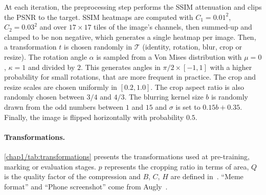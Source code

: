 At each iteration, the preprocessing step performs the SSIM attenuation and clips the PSNR to the target. 
SSIM heatmaps are computed with $C_1=0.01^2$, $C_2=0.03^2$ and over $17\times 17$ tiles of the image's channels, then summed-up and clamped to be non negative, which generates a single heatmap per image. 
Then, a transformation $t$ is chosen randomly in $\mathcal T$ (identity, rotation, blur, crop or resize). 
The rotation angle $\alpha$ is sampled from a Von Mises distribution with $\mu=0$, $\kappa=1$ and divided by $2$. 
This generates angles in $\pi/2\times[-1,1]$ with a higher probability for small rotations, that are more frequent in practice. 
The crop and resize scales are chosen uniformly in $[0.2, 1.0]$. 
The crop aspect ratio is also randomly chosen between $3/4$ and $4/3$.
The blurring kernel size $b$ is randomly drawn from the odd numbers between $1$ and $15$ and $\sigma$ is set to $0.15 b+0.35$.
Finally, the image is flipped horizontally with probability $0.5$.

\paragraph*{Transformations.} 
\autoref{chap1/tab:transformations} presents the transformations used at pre-training, marking or evaluation stages. 
$p$ represents the cropping ratio in terms of area, $Q$ is the quality factor of the compression and $B$, $C$, $H$ are defined in~\citep{marcel2010torchvision}. 
``Meme format'' and ``Phone screenshot'' come from Augly~\citep{bitton2021augly}. 

